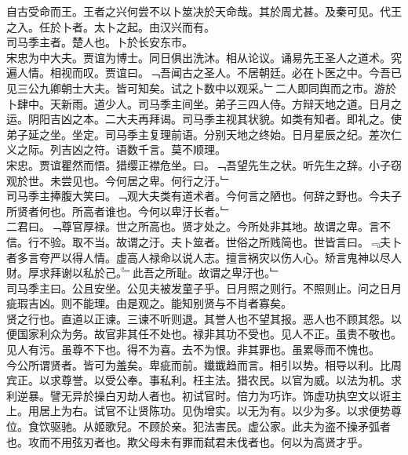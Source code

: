 \documentclass{zhvt-classic}
\begin{document}

\hspace*{2em}自古受命而王。王者之兴何尝不以卜筮决於天命哉。其於周尤甚。及秦可见。代王之入。任於卜者。太卜之起。由汉兴而有。\\
\hspace*{2em}司马季主者。楚人也。卜於长安东市。\\
\hspace*{2em}宋忠为中大夫。贾谊为博士。同日俱出洗沐。相从论议。诵易先王圣人之道术。究遍人情。相视而叹。贾谊曰。﹁吾闻古之圣人。不居朝廷。必在卜医之中。今吾已见三公九卿朝士大夫。皆可知矣。试之卜数中以观采。﹂二人即同舆而之市。游於卜肆中。天新雨。道少人。司马季主间坐。弟子三四人侍。方辩天地之道。日月之运。阴阳吉凶之本。二大夫再拜谒。司马季主视其状貌。如类有知者。即礼之。使弟子延之坐。坐定。司马季主复理前语。分别天地之终始。日月星辰之纪。差次仁义之际。列吉凶之符。语数千言。莫不顺理。\\
\hspace*{2em}宋忠。贾谊瞿然而悟。猎缨正襟危坐。曰。﹁吾望先生之状。听先生之辞。小子窃观於世。未尝见也。今何居之卑。何行之汙。﹂\\
\hspace*{2em}司马季主捧腹大笑曰。﹁观大夫类有道术者。今何言之陋也。何辞之野也。今夫子所贤者何也。所高者谁也。今何以卑汙长者。﹂\\
\hspace*{2em}二君曰。﹁尊官厚禄。世之所高也。贤才处之。今所处非其地。故谓之卑。言不信。行不验。取不当。故谓之汙。夫卜筮者。世俗之所贱简也。世皆言曰。﹃夫卜者多言夸严以得人情。虚高人禄命以说人志。擅言祸灾以伤人心。矫言鬼神以尽人财。厚求拜谢以私於己。﹄此吾之所耻。故谓之卑汙也。﹂\\
\hspace*{2em}司马季主曰。公且安坐。公见夫被发童子乎。日月照之则行。不照则止。问之日月疵瑕吉凶。则不能理。由是观之。能知别贤与不肖者寡矣。\\
\hspace*{2em}贤之行也。直道以正谏。三谏不听则退。其誉人也不望其报。恶人也不顾其怨。以便国家利众为务。故官非其任不处也。禄非其功不受也。见人不正。虽贵不敬也。见人有污。虽尊不下也。得不为喜。去不为恨。非其罪也。虽累辱而不愧也。\\
\hspace*{2em}今公所谓贤者。皆可为羞矣。卑疵而前。孅韱趋而言。相引以势。相导以利。比周宾正。以求尊誉。以受公奉。事私利。枉主法。猎农民。以官为威。以法为机。求利逆暴。譬无异於操白刃劫人者也。初试官时。倍力为巧诈。饰虚功执空文以诳主上。用居上为右。试官不让贤陈功。见伪增实。以无为有。以少为多。以求便势尊位。食饮驱驰。从姬歌兒。不顾於亲。犯法害民。虚公家。此夫为盗不操矛弧者也。攻而不用弦刃者也。欺父母未有罪而弑君未伐者也。何以为高贤才乎。\\
\end{document}
